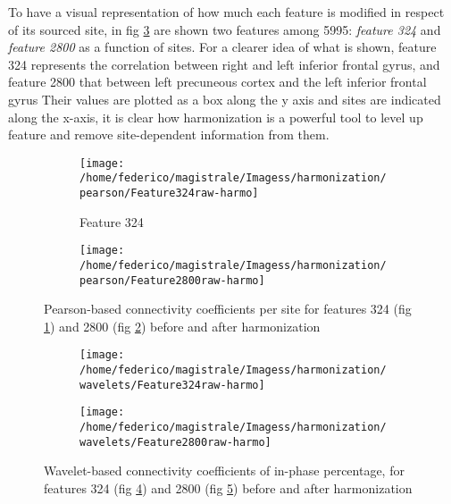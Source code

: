 \documentclass[11pt]{report}
\begin{document}
To have a visual representation of how much each feature is modified in respect of its sourced site, in fig \ref{fig:features_raw-harmo} are shown two features among 5995: \emph{feature 324} and \emph{feature 2800} as a function of sites.
For a clearer idea of what is shown, feature 324 represents the correlation between right and left inferior frontal gyrus, and feature 2800 that between left precuneous cortex and the left inferior frontal gyrus
Their values are plotted as a box along the y axis and sites are indicated along the x-axis, it is clear how harmonization is a powerful tool to level up feature and remove site-dependent information from them.

\begin{figure}
\centering
\begin{subfigure}[b]{1.\textwidth}
   \texttt{[image: /home/federico/magistrale/Imagess/harmonization/pearson/Feature324raw-harmo]}
   \caption{Feature 324 }
   \label{fig:feature324}
\end{subfigure}
\begin{subfigure}[b]{1.\textwidth}
   \texttt{[image: /home/federico/magistrale/Imagess/harmonization/pearson/Feature2800raw-harmo]}
   \caption{}
   \label{fig:feature2800}
\end{subfigure}
\caption{Pearson-based connectivity coefficients per site for features 324 (fig \ref{fig:feature324}) and 2800 (fig \ref{fig:feature2800}) before and after harmonization}
\label{fig:features_raw-harmo}
\end{figure}



 \begin{figure}
 \centering
 \begin{subfigure}[b]{1.\textwidth}
    \texttt{[image: /home/federico/magistrale/Imagess/harmonization/wavelets/Feature324raw-harmo]}
    \caption{}
    \label{fig:wavelet_feature324}
 \end{subfigure}
 \begin{subfigure}[b]{1.\textwidth}
    \texttt{[image: /home/federico/magistrale/Imagess/harmonization/wavelets/Feature2800raw-harmo]}
    \caption{}
    \label{fig:wavelet_feature2800}
 \end{subfigure}
 \caption{Wavelet-based connectivity coefficients of in-phase percentage, for features 324 (fig \ref{fig:wavelet_feature324}) and 2800 (fig \ref{fig:wavelet_feature2800}) before and after harmonization}
 \label{fig:wavelet_features_raw-harmo}
 \end{figure}
\end{document}
